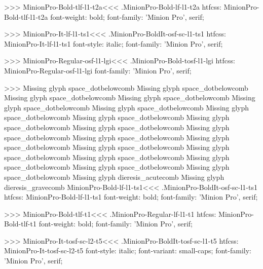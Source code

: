 {>>>
\<MinionPro-Bold-tlf-l1-t2a\><<<
.MinionPro-Bold-lf-l1-t2a
htfcss:  MinionPro-Bold-tlf-l1-t2a  font-weight: bold; font-family: 'Minion Pro', serif;

>>>
\<MinionPro-It-lf-l1-ts1\><<<
.MinionPro-BoldIt-osf-sc-l1-ts1
htfcss:  MinionPro-It-lf-l1-ts1  font-style: italic; font-family: 'Minion Pro', serif;

>>>
\<MinionPro-Regular-osf-l1-lgi\><<<
.MinionPro-Bold-tosf-l1-lgi
htfcss:  MinionPro-Regular-osf-l1-lgi  font-family: 'Minion Pro', serif;

>>>
Missing glyph	space_dotbelowcomb
Missing glyph	space_dotbelowcomb
Missing glyph	space_dotbelowcomb
Missing glyph	space_dotbelowcomb
Missing glyph	space_dotbelowcomb
Missing glyph	space_dotbelowcomb
Missing glyph	space_dotbelowcomb
Missing glyph	space_dotbelowcomb
Missing glyph	space_dotbelowcomb
Missing glyph	space_dotbelowcomb
Missing glyph	space_dotbelowcomb
Missing glyph	space_dotbelowcomb
Missing glyph	space_dotbelowcomb
Missing glyph	space_dotbelowcomb
Missing glyph	space_dotbelowcomb
Missing glyph	space_dotbelowcomb
Missing glyph	space_dotbelowcomb
Missing glyph	space_dotbelowcomb
Missing glyph	space_dotbelowcomb
Missing glyph	dieresis_acutecomb
Missing glyph	dieresis_gravecomb
\<MinionPro-Bold-lf-l1-ts1\><<<
.MinionPro-BoldIt-osf-sc-l1-ts1
htfcss:  MinionPro-Bold-lf-l1-ts1  font-weight: bold; font-family: 'Minion Pro', serif;

>>>
\<MinionPro-Bold-tlf-t1\><<<
.MinionPro-Regular-lf-l1-t1
htfcss:  MinionPro-Bold-tlf-t1  font-weight: bold; font-family: 'Minion Pro', serif;

>>>
\<MinionPro-It-tosf-sc-l2-t5\><<<
.MinionPro-BoldIt-tosf-sc-l1-t5
htfcss:  MinionPro-It-tosf-sc-l2-t5  font-style: italic; font-variant: small-caps; font-family: 'Minion Pro', serif;

}
